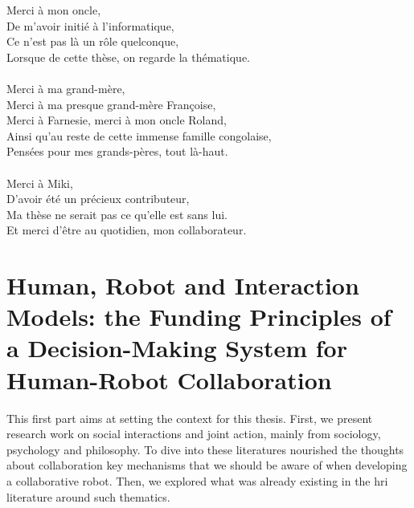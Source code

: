 \documentclass[english,a4paper,11pt,twoside]{StyleThese}
\begin{document}
Merci à mon oncle,\\
De m'avoir initié à l'informatique,\\
Ce n'est pas là un rôle quelconque,\\
Lorsque de cette thèse, on regarde la thématique.\\
\\
Merci à ma grand-mère,\\
Merci à ma presque grand-mère Françoise,\\
Merci à Farnesie, merci à mon oncle Roland,\\
Ainsi qu'au reste de cette immense famille congolaise,\\
Pensées pour mes grands-pères, tout là-haut.\\
\\
Merci à Miki,\\
D'avoir été un précieux contributeur,\\
Ma thèse ne serait pas ce qu'elle est sans lui.\\
Et merci d'être au quotidien, mon collaborateur.






\tableofcontents

\printnoidxglossary[type=\acronymtype]
%



\mainmatter
{}

\fancyhead[RE]{\bfseries\nouppercase{\leftmark}}      %
\fancyhead[LO]{\bfseries\nouppercase{\rightmark}}     %

\part{Human, Robot and Interaction Models: the Funding Principles of a Decision-Making System for Human-Robot Collaboration}\label{part:part1}
\begin{partintro}
	This first part aims at setting the context for this thesis. First, we present research work on social interactions and joint action, mainly from sociology, psychology and philosophy. To dive into these literatures nourished the thoughts about collaboration key mechanisms that we should be aware of when developing a collaborative robot. Then, we explored what was already existing in the \acrlong{hri} literature around such thematics.
\end{partintro}


\end{document}
